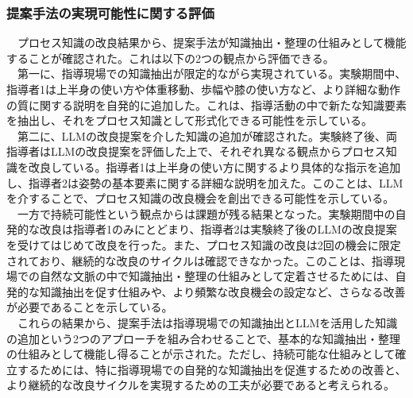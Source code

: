 \subsubsection{提案手法の実現可能性に関する評価}
　プロセス知識の改良結果から、提案手法が知識抽出・整理の仕組みとして機能することが確認された。これは以下の2つの観点から評価できる。 \\

　第一に、指導現場での知識抽出が限定的ながら実現されている。実験期間中、指導者1は上半身の使い方や体重移動、歩幅や膝の使い方など、より詳細な動作の質に関する説明を自発的に追加した。これは、指導活動の中で新たな知識要素を抽出し、それをプロセス知識として形式化できる可能性を示している。 \\

　第二に、LLMの改良提案を介した知識の追加が確認された。実験終了後、両指導者はLLMの改良提案を評価した上で、それぞれ異なる観点からプロセス知識を改良している。指導者1は上半身の使い方に関するより具体的な指示を追加し、指導者2は姿勢の基本要素に関する詳細な説明を加えた。このことは、LLMを介することで、プロセス知識の改良機会を創出できる可能性を示している。 \\

　一方で持続可能性という観点からは課題が残る結果となった。実験期間中の自発的な改良は指導者1のみにとどまり、指導者2は実験終了後のLLMの改良提案を受けてはじめて改良を行った。また、プロセス知識の改良は2回の機会に限定されており、継続的な改良のサイクルは確認できなかった。このことは、指導現場での自然な文脈の中で知識抽出・整理の仕組みとして定着させるためには、自発的な知識抽出を促す仕組みや、より頻繁な改良機会の設定など、さらなる改善が必要であることを示している。 \\

　これらの結果から、提案手法は指導現場での知識抽出とLLMを活用した知識の追加という2つのアプローチを組み合わせることで、基本的な知識抽出・整理の仕組みとして機能し得ることが示された。ただし、持続可能な仕組みとして確立するためには、特に指導現場での自発的な知識抽出を促進するための改善と、より継続的な改良サイクルを実現するための工夫が必要であると考えられる。 \\

